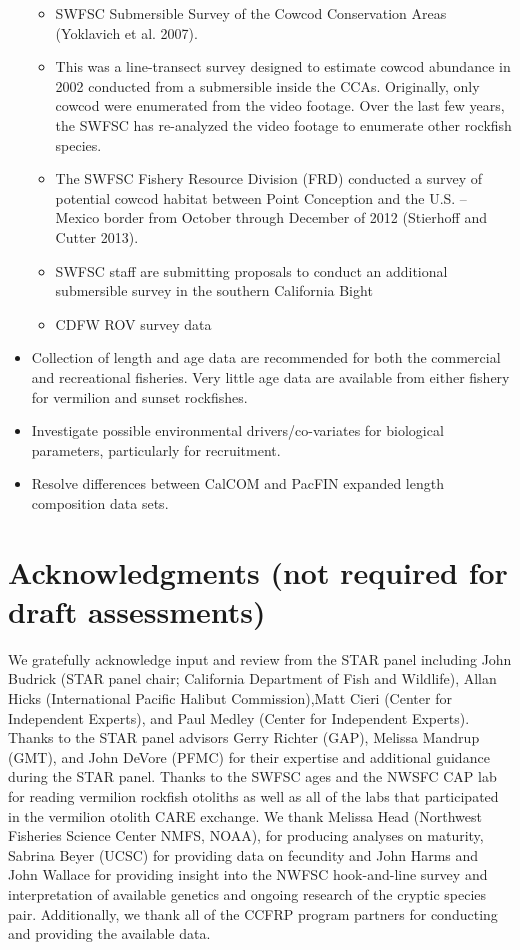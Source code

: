 \documentclass[
  english,
  a4paper,
]{article}
\providecommand{\tightlist}{%
  \setlength{\itemsep}{0pt}\setlength{\parskip}{0pt}}
\begin{document}
\begin{itemize}
  \begin{itemize}
  \tightlist
  \item
    SWFSC Submersible Survey of the Cowcod Conservation Areas (Yoklavich et al. 2007).
  \item
    This was a line-transect survey designed to estimate cowcod abundance in 2002
    conducted from a submersible inside the CCAs. Originally, only cowcod were enumerated from the video footage. Over the last few years, the SWFSC has re-analyzed the video footage to enumerate other rockfish species.
  \item
    The SWFSC Fishery Resource Division (FRD) conducted a survey of potential cowcod habitat between Point Conception and the U.S. -- Mexico border from October through December of 2012 (Stierhoff and Cutter 2013).
  \item
    SWFSC staff are submitting proposals to conduct an additional submersible survey in the southern California Bight
  \item
    CDFW ROV survey data
  \end{itemize}
\item
  Collection of length and age data are recommended for both the commercial and
  recreational fisheries. Very little age data are available from either fishery for
  vermilion and sunset rockfishes.
\item
  Investigate possible environmental drivers/co-variates for biological parameters,
  particularly for recruitment.
\item
  Resolve differences between CalCOM and PacFIN expanded length composition data sets.
\end{itemize}

\clearpage

\hypertarget{acknowledgments-not-required-for-draft-assessments}{%
\section{Acknowledgments (not required for draft assessments)}\label{acknowledgments-not-required-for-draft-assessments}}

We gratefully acknowledge input and review from the STAR panel including John
Budrick (STAR panel chair; California Department of Fish and Wildlife),
Allan Hicks (International Pacific Halibut Commission),Matt Cieri (Center for
Independent Experts), and Paul Medley (Center for Independent Experts). Thanks
to the STAR panel advisors Gerry Richter (GAP), Melissa Mandrup (GMT), and John
DeVore (PFMC) for their expertise and additional guidance during the STAR panel.
Thanks to the SWFSC ages and the NWSFC CAP lab for reading vermilion rockfish otoliths as well as all of the labs that participated in the vermilion otolith CARE exchange. We thank Melissa Head (Northwest Fisheries Science Center NMFS, NOAA), for producing analyses on maturity, Sabrina Beyer (UCSC) for providing data on fecundity and John Harms and John Wallace for providing insight into the NWFSC hook-and-line survey and interpretation of available genetics and ongoing research of the cryptic species pair. Additionally, we thank all of the CCFRP program partners for conducting and providing the available data.
\end{document}
